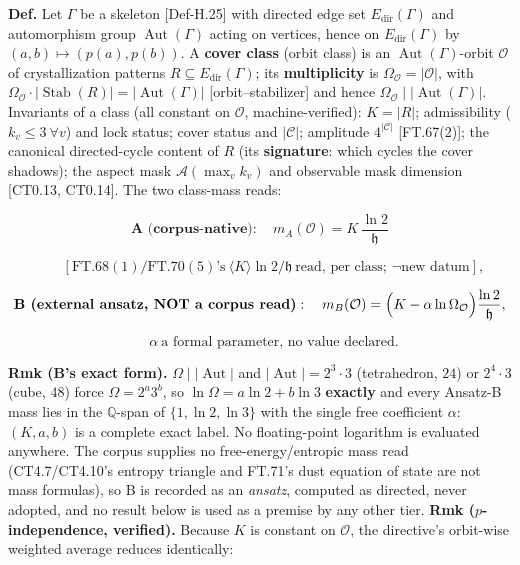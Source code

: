 \begin{definition}\label{tag:Def-H-28}
\textbf{Def.} Let $\Gamma$ be a skeleton [Def-H.25] with directed edge set $E_{\mathrm{dir}}(\Gamma)$ and automorphism group $\operatorname{Aut}(\Gamma)$ acting on vertices, hence on $E_{\mathrm{dir}}(\Gamma)$ by $(a,b)\mapsto(p(a),p(b))$. A \textbf{cover class} (orbit class) is an $\operatorname{Aut}(\Gamma)$-orbit $\mathcal O$ of crystallization patterns $R\subseteq E_{\mathrm{dir}}(\Gamma)$; its \textbf{multiplicity} is $\Omega_{\mathcal O}=|\mathcal O|$, with $\Omega_{\mathcal O}\cdot|\operatorname{Stab}(R)|=|\operatorname{Aut}(\Gamma)|$ [orbit–stabilizer] and hence $\Omega_{\mathcal O}\mid|\operatorname{Aut}(\Gamma)|$. Invariants of a class (all constant on $\mathcal O$, machine-verified): $K=|R|$; admissibility ($k_v\le3\ \forall v$) and lock status; cover status and $|\mathcal C|$; amplitude $4^{|\mathcal C|}$ [FT.67(2)]; the canonical directed-cycle content of $R$ (its \textbf{signature}: which cycles the cover shadows); the aspect mask $\mathcal A(\max_v k_v)$ and observable mask dimension [CT0.13, CT0.14]. The two class-mass reads:

\[
\textbf{A (corpus-native)}:\quad m_A(\mathcal O)=K\,\frac{\ln2}{\mathfrak h}
\]

\[
\qquad [\text{FT.68}(1)/\text{FT.70}(5)\text{'s}\ \langle K\rangle\ln2/\mathfrak h\ \text{read, per class};\ \neg\text{new datum}],
\]

\[
\textbf{B (external ansatz, NOT a corpus read)}:\quad m_B(\mathcal O)=\Bigl(K-\alpha\ln\Omega_{\mathcal O}\Bigr)\frac{\ln2}{\mathfrak h},
\]

\[
\qquad \alpha\ \text{a formal parameter, no value declared}.
\]

\textbf{Rmk (B's exact form).} $\Omega\mid|\operatorname{Aut}|$ and $|\operatorname{Aut}|=2^3\cdot3$ (tetrahedron, $24$) or $2^4\cdot3$ (cube, $48$) force $\Omega=2^a3^b$, so $\ln\Omega=a\ln2+b\ln3$ \textbf{exactly} and every Ansatz-B mass lies in the $\mathbb Q$-span of $\{1,\ln2,\ln3\}$ with the single free coefficient $\alpha$: $(K,a,b)$ is a complete exact label. No floating-point logarithm is evaluated anywhere. The corpus supplies no free-energy/entropic mass read (CT4.7/CT4.10's entropy triangle and FT.71's dust equation of state are not mass formulas), so B is recorded as an \textit{ansatz}, computed as directed, never adopted, and no result below is used as a premise by any other tier. \textbf{Rmk ($p$-independence, verified).} Because $K$ is constant on $\mathcal O$, the directive's orbit-wise weighted average reduces identically:


\end{definition}
